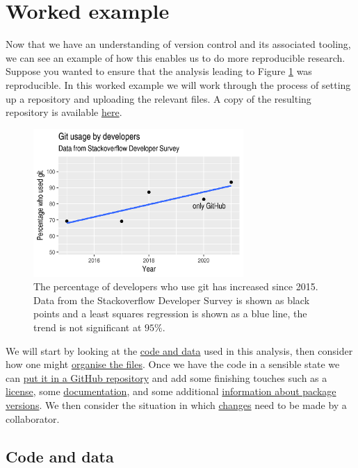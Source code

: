 \documentclass[11pt,onecolumn]{scrartcl}
\begin{document}
\section{Worked example}
\label{sec:orgd479495}

Now that we have an understanding of version control and its associated tooling,
we can see an example of how this enables us to do more reproducible research.
Suppose you wanted to ensure that the analysis leading to Figure
\ref{fig:demo-result-1} was reproducible. In this worked example we will work through
the process of setting up a repository and uploading the relevant files. A copy
of the resulting repository is available \href{https://github.com/aezarebski/git-usage}{here}.

\begin{figure}[htbp]
\centering
\includegraphics[width=8cm]{./git-usage-1.png}
\caption{\label{fig:demo-result-1}The percentage of developers who use git has increased since 2015. Data from the Stackoverflow Developer Survey is shown as black points and a least squares regression is shown as a blue line, the trend is not significant at \(95\%\).}
\end{figure}

We will start by looking at the \hyperref[sec:orga976b10]{code and data} used in this analysis, then
consider how one might \hyperref[sec:org60f3cc8]{organise the files}. Once we have the code in a sensible
state we can \hyperref[sec:orgb2697f6]{put it in a GitHub repository} and add some finishing touches such
as a \hyperref[sec:org107427a]{license}, some \hyperref[sec:org5f03008]{documentation}, and some additional \hyperref[sec:orgcbfab40]{information about package
versions}. We then consider the situation in which \hyperref[sec:orgcd375b2]{changes} need to be made by a
collaborator.

\subsection{Code and data}
\label{sec:orga976b10}
\end{document}
